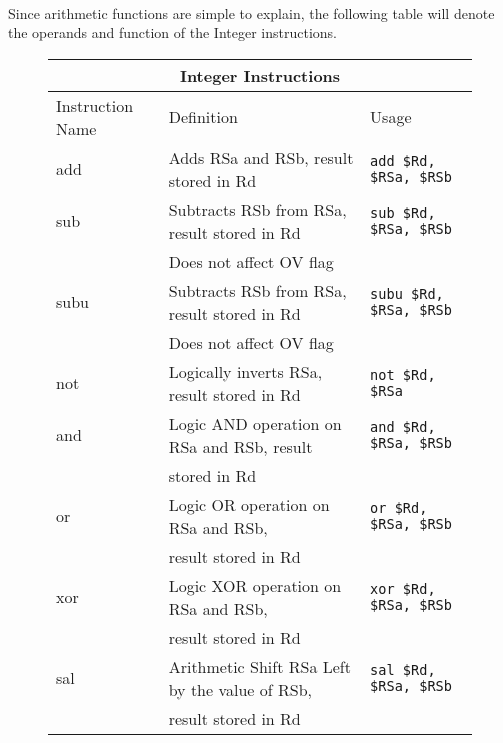 \documentclass[letterpaper, 11pt]{article}
\begin{document}
\paragraph{} Since arithmetic functions are simple to explain, the following table will denote the operands and function of the Integer instructions. 

\begin{figure}[!h]
	\begin{center}
		\begin{tabular}{|l|l|l|}
			\hline
			\multicolumn{3}{c}{Integer Instructions} \\ \hline
			Instruction Name	& Definition															& Usage 							\\ \hline
			add					& Adds RSa and RSb, result stored in Rd									& \texttt{add \$Rd, \$RSa, \$RSb}	\\ \hline
			sub					& Subtracts RSb from RSa, result stored in Rd							& \texttt{sub \$Rd, \$RSa, \$RSb}	\\ \hline
			\hfill				& Does not affect OV flag												& \hfill 							\\ \hline
			subu 				& Subtracts RSb from RSa, result stored in Rd							& \texttt{subu \$Rd, \$RSa, \$RSb}	\\ 
			\hfill				& Does not affect OV flag												& \hfill 							\\ \hline
			not					& Logically inverts RSa, result stored in Rd							& \texttt{not \$Rd, \$RSa} 			\\ \hline
			and					& Logic AND operation on RSa and RSb, result							& \texttt{and \$Rd, \$RSa, \$RSb}	\\	
			\hfill				& stored in Rd															& \hfill 							\\ \hline
			or					& Logic OR operation on RSa and RSb, 									& \texttt{or \$Rd, \$RSa, \$RSb	}	\\ 	
			\hfill				& result stored in Rd													& \hfill 							\\ \hline
			xor					& Logic XOR operation on RSa and RSb,									& \texttt{xor \$Rd, \$RSa, \$RSb}	\\ 
			\hfill				& result stored in Rd													& \hfill 							\\ \hline	
			sal					& Arithmetic Shift RSa Left by the value of RSb,						& \texttt{sal \$Rd, \$RSa, \$RSb}	\\ 	
			\hfill				& result stored in Rd													& \hfill 							\\ \hline

\end{tabular}
\end{center}
\end{figure}
\end{document}
